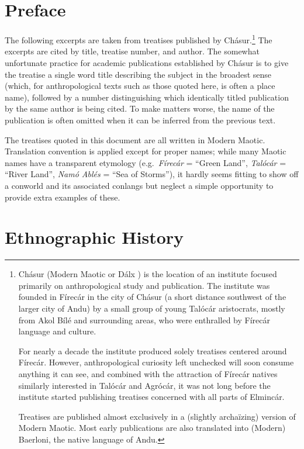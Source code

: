 \documentclass{article}
\begin{document}
\color{DarkGreen}

\section*{Preface}

The following excerpts are taken from treatises published by Chásur.\footnote{\color{DarkGreen} Chásur (Modern Maotic  or Dálx ) is the location of an institute focused primarily on anthropological study and publication. The institute was founded in Fírecár in the city of Chásur (a short distance southwest of the larger city of Andu) by a small group of young Talócár aristocrats, mostly from Akol Bílé and surrounding areas, who were enthralled by Fírecár language and culture. \par For nearly a decade the institute produced solely treatises centered around Fírecár. However, anthropological curiosity left unchecked will soon consume anything it can see, and combined with the attraction of Fírecár natives similarly interested in Talócár and Agrócár, it was not long before the institute started publishing treatises concerned with all parts of Elmincár. \par Treatises are published almost exclusively in a (slightly archaïzing) version of Modern Maotic. Most early publications are also translated into (Modern) Baerloni, the native language of Andu.} The excerpts are cited by title, treatise number, and author. The somewhat unfortunate practice for academic publications established by Chásur is to give the treatise a single word title describing the subject in the broadest sense (which, for anthropological texts such as those quoted here, is often a place name), followed by a number distinguishing which identically titled publication by the same author is being cited. To make matters worse, the name of the publication is often omitted when it can be inferred from the previous text.

The treatises quoted in this document are all written in Modern Maotic. Translation convention is applied except for proper names; while many Maotic names have a transparent etymology (e.g.\ \textit{Fírecár} = ``Green Land'', \textit{Talócár} = ``River Land'', \textit{Namó Ablés} = ``Sea of Storms''), it hardly seems fitting to show off a conworld and its associated conlangs but neglect a simple opportunity to provide extra examples of these.

\color{DarkGreen}
\section*{Ethnographic History}
\end{document}
